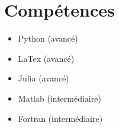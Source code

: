 \section*{Compétences \qquad\qquad {}}
\begin{minipage}[t]{0.4\linewidth}
\begin{itemize}
    \item Python (avancé)
    \item LaTex (avancé)
    \item Julia (avancé)
\end{itemize}
\end{minipage}\hfill
\begin{minipage}[t]{0.6\linewidth}
\begin{itemize}
    \item Matlab (intermédiaire)
    \item Fortran (intermédiaire)
\end{itemize}
\end{minipage}